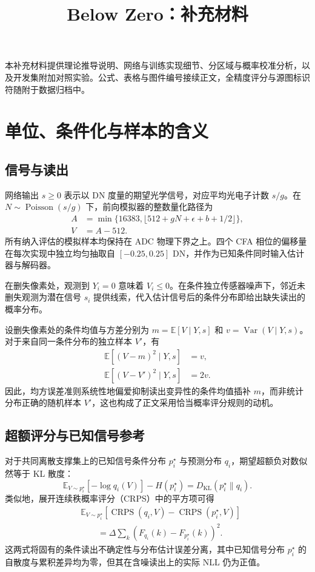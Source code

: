 \documentclass[10pt,twocolumn,journal]{IEEEtran}
\DeclareMathOperator{\CRPS}{CRPS}
\newcommand{\E}{\mathbb E}
\begin{document}
\title{Below Zero：补充材料}
\author{\BZAuthorBlockZH}
\maketitle
\thispagestyle{fancy}

本补充材料提供理论推导说明、网络与训练实现细节、分区域与概率校准分析，以及开发集附加对照实验。公式、表格与图件编号接续正文，全精度评分与源图标识符随附于数据归档中。

\section{单位、条件化与样本的含义}
\subsection{信号与读出}
网络输出 $s\geq0$ 表示以 DN 度量的期望光学信号，对应平均光电子计数 $s/g$。在 $N\sim\operatorname{Poisson}(s/g)$ 下，前向模拟器的整数量化路径为
\begin{equation}
\begin{aligned}
A&=\min\{16383,\lfloor512+gN+\epsilon+b+1/2\rfloor\},\\
V&=A-512.
\end{aligned}
\end{equation}
所有纳入评估的模拟样本均保持在 ADC 物理下界之上。四个 CFA 相位的偏移量在每次实现中独立均匀抽取自 $[-0.25,0.25]$ DN，并作为已知条件同时输入估计器与解码器。

在删失像素处，观测到 $Y_i=0$ 意味着 $V_i\leq0$。在条件独立传感器噪声下，邻近未删失观测为潜在信号 $s_i$ 提供线索，代入估计信号后的条件分布即给出缺失读出的概率分布。

设删失像素处的条件均值与方差分别为 $m=\E[V\mid Y,s]$ 和 $v=\operatorname{Var}(V\mid Y,s)$。对于来自同一条件分布的独立样本 $V'$，有
\begin{align}
\E[(V-m)^2\mid Y,s]&=v,\\
\E[(V-V')^2\mid Y,s]&=2v.
\end{align}
因此，均方误差准则系统性地偏爱抑制读出变异性的条件均值插补 $m$，而非统计分布正确的随机样本 $V'$，这也构成了正文采用恰当概率评分规则的动机。

\subsection{超额评分与已知信号参考}
对于共同离散支撑集上的已知信号条件分布 $p_i^\star$ 与预测分布 $q_i$，期望超额负对数似然等于 KL 散度：
\begin{equation}
\E_{V\sim p_i^\star}[-\log q_i(V)]-H(p_i^\star)=D_{\mathrm{KL}}(p_i^\star\|q_i).
\end{equation}
类似地，展开连续秩概率评分（CRPS）中的平方项可得
\begin{equation}
\begin{split}
&\E_{V\sim p_i^\star}[\CRPS(q_i,V)-\CRPS(p_i^\star,V)]\\
&\qquad=\Delta\sum_k\left(F_{q_i}(k)-F_{p_i^\star}(k)\right)^2.
\end{split}
\end{equation}
这两式将固有的条件读出不确定性与分布估计误差分离，其中已知信号分布 $p_i^\star$ 的自散度与累积差异均为零，但其在含噪读出上的实际 NLL 仍为正值。
\end{document}
